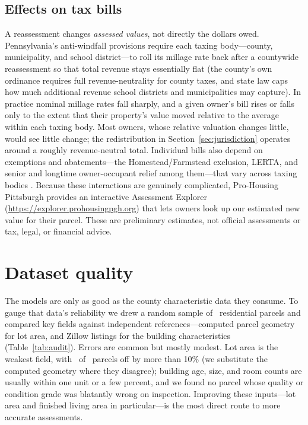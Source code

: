 \documentclass[11pt]{article}
\begin{document}
\subsection{Effects on tax bills}
A reassessment changes \emph{assessed values}, not directly the dollars owed.
Pennsylvania's anti-windfall provisions require each taxing body---county,
municipality, and school district---to roll its millage rate back after a
countywide reassessment so that total revenue stays essentially flat (the county's
own ordinance requires full revenue-neutrality for county taxes, and state law caps
how much additional revenue school districts and municipalities may capture). In
practice nominal millage rates fall sharply, and a given owner's bill rises or
falls only to the extent that their property's value moved relative to the average
within each taxing body. Most owners, whose relative valuation changes little,
would see little change; the redistribution in Section~\ref{sec:jurisdiction}
operates around a roughly revenue-neutral total. Individual bills also depend on
exemptions and abatements---the Homestead/Farmstead exclusion, LERTA, and senior
and longtime owner-occupant relief among them---that vary across taxing bodies
\citep{acs_tax_exempt}. Because these interactions are genuinely complicated,
Pro-Housing Pittsburgh provides an interactive Assessment Explorer
(\url{https://explorer.prohousingpgh.org}) that lets owners look up our estimated
new value for their parcel. These are preliminary estimates, not official
assessments or tax, legal, or financial advice.

\section{Dataset quality}\label{sec:data-quality}
The models are only as good as the county characteristic data they consume. To
gauge that data's reliability we drew a random sample of \auditSampleN\ residential
parcels and compared key fields against independent references---computed parcel
geometry for lot area, and Zillow listings for the building characteristics
(Table~\ref{tab:audit}). Errors are common but mostly modest. Lot area is the
weakest field, with \auditLotAny\ of \auditSampleN\ parcels off by more than
10\% (we substitute the computed geometry where they disagree); building age,
size, and room counts are usually within one unit or a few percent, and we found no
parcel whose quality or condition grade was blatantly wrong on inspection.
Improving these inputs---lot area and finished living area in particular---is the
most direct route to more accurate assessments.
\end{document}
